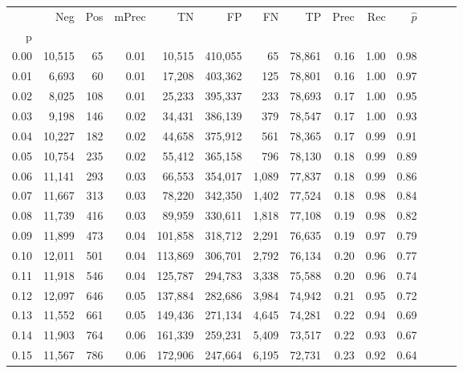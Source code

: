 \begin{tabular}{rrrrrrrrrrrrrr}
\toprule
{} &     Neg &    Pos & mPrec &       TN &       FP &      FN &      TP &  Prec &   Rec & $\hat{p}$ \\
p    &         &        &       &          &          &         &         &       &       &           \\
\midrule
0.00 &  10,515 &     65 &  0.01 &   10,515 &  410,055 &      65 &  78,861 &  0.16 &  1.00 &      0.98 \\
0.01 &   6,693 &     60 &  0.01 &   17,208 &  403,362 &     125 &  78,801 &  0.16 &  1.00 &      0.97 \\
0.02 &   8,025 &    108 &  0.01 &   25,233 &  395,337 &     233 &  78,693 &  0.17 &  1.00 &      0.95 \\
0.03 &   9,198 &    146 &  0.02 &   34,431 &  386,139 &     379 &  78,547 &  0.17 &  1.00 &      0.93 \\
0.04 &  10,227 &    182 &  0.02 &   44,658 &  375,912 &     561 &  78,365 &  0.17 &  0.99 &      0.91 \\
0.05 &  10,754 &    235 &  0.02 &   55,412 &  365,158 &     796 &  78,130 &  0.18 &  0.99 &      0.89 \\
0.06 &  11,141 &    293 &  0.03 &   66,553 &  354,017 &   1,089 &  77,837 &  0.18 &  0.99 &      0.86 \\
0.07 &  11,667 &    313 &  0.03 &   78,220 &  342,350 &   1,402 &  77,524 &  0.18 &  0.98 &      0.84 \\
0.08 &  11,739 &    416 &  0.03 &   89,959 &  330,611 &   1,818 &  77,108 &  0.19 &  0.98 &      0.82 \\
0.09 &  11,899 &    473 &  0.04 &  101,858 &  318,712 &   2,291 &  76,635 &  0.19 &  0.97 &      0.79 \\
0.10 &  12,011 &    501 &  0.04 &  113,869 &  306,701 &   2,792 &  76,134 &  0.20 &  0.96 &      0.77 \\
0.11 &  11,918 &    546 &  0.04 &  125,787 &  294,783 &   3,338 &  75,588 &  0.20 &  0.96 &      0.74 \\
0.12 &  12,097 &    646 &  0.05 &  137,884 &  282,686 &   3,984 &  74,942 &  0.21 &  0.95 &      0.72 \\
0.13 &  11,552 &    661 &  0.05 &  149,436 &  271,134 &   4,645 &  74,281 &  0.22 &  0.94 &      0.69 \\
0.14 &  11,903 &    764 &  0.06 &  161,339 &  259,231 &   5,409 &  73,517 &  0.22 &  0.93 &      0.67 \\
0.15 &  11,567 &    786 &  0.06 &  172,906 &  247,664 &   6,195 &  72,731 &  0.23 &  0.92 &      0.64 \\

\end{tabular}
